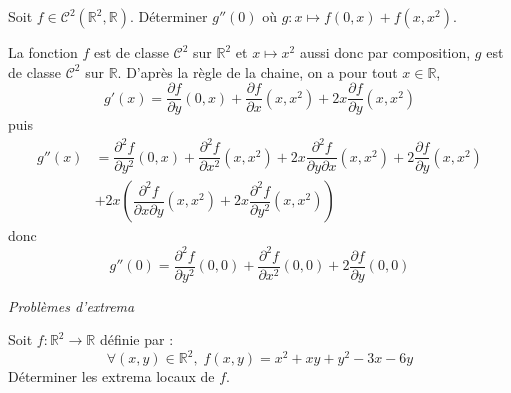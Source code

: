\documentclass[a4paper,10pt]{report}
\begin{document}
\begin{Exercice}{} Soit $f \in \mathcal{C}^2(\mathbb{R}^2, \mathbb{R})$. Déterminer $g''(0)$ où $g : x \mapsto f(0,x)+f(x,x^2)$.
\end{Exercice}

\corr La fonction $f$ est de classe $\mathcal{C}^2$ sur $\mathbb{R}^2$ et $x \mapsto x^2$ aussi donc par composition, $g$ est de classe $\mathcal{C}^2$ sur $\mathbb{R}$. D'après la règle de la chaine, on a pour tout $x \in \mathbb{R}$,
$$ g'(x) = \dfrac{\partial f}{\partial y}(0,x) + \dfrac{\partial f}{\partial x}(x,x^2) + 2x \dfrac{\partial f}{\partial y}(x,x^2)$$
puis 
\begin{align*}
 g''(x) & = \dfrac{\partial^2 f}{\partial y^2}(0,x) +  \dfrac{\partial^2 f}{\partial x^2}(x,x^2) + 2x  \dfrac{\partial^2 f}{ \partial y\partial x}(x,x^2) + 2 \dfrac{\partial f}{\partial y}(x,x^2) \\
 & + 2x \left( \dfrac{\partial^2 f}{ \partial x \partial y}(x,x^2) + 2x\dfrac{\partial^2 f}{\partial y^2}(x,x^2) \right)
 \end{align*}
 donc
 $$ g''(0) =  \dfrac{\partial^2 f}{\partial y^2}(0,0) +  \dfrac{\partial^2 f}{\partial x^2}(0,0) + 2 \dfrac{\partial f}{\partial y}(0,0) $$
 
 
 \medskip
 
 \begin{center}
\textit{{ {\large Problèmes d'extrema}}}
\end{center}

\begin{Exercice}{} Soit $f : \mathbb{R}^2 \rightarrow \mathbb{R}$ définie par :
$$ \forall (x,y) \in \mathbb{R}^2, \; f(x,y) = x^{2} + xy + y^{2} - 3x - 6y$$
Déterminer les extrema locaux de $f$.
\end{Exercice}
\end{document}
